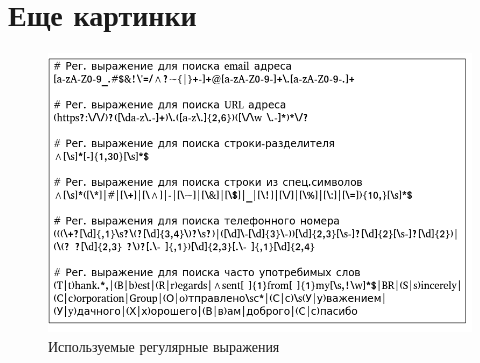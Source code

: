 \chapter{Еще картинки}
\label{cha:appendix2}

\begin{figure}[h]
	\centering{}
	\includegraphics[width=\textwidth]{inc/img/reg_exp.png}
	\caption{Используемые регулярные выражения}
\end{figure}


